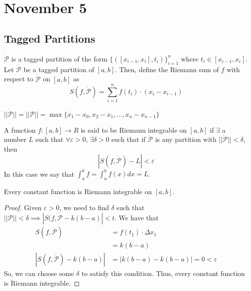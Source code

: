 \section{November 5}

\subsection{Tagged Partitions}
\begin{definition}
    $\dot{\mathcal{P}}$ is a tagged partition of the form $\{([x_{i - 1}, x_i], t_i)\}_{i = 1}^n$ where $t_i \in [x_{i - 1}, x_i]$. Let $\dot{\mathcal{P}}$ be a tagged partition of $[a, b]$. Then, define the Riemann sum of $f$ with respect to $\dot{\mathcal{P}}$ on $[a, b]$ as $$S(f, \dot{\mathcal{P}}) = \sum_{i = 1}^n f(t_i) \cdot (x_i - x_{i - 1})$$
\end{definition}
\begin{remark}
    $||\dot{\mathcal{P}}|| = ||\mathcal{P}|| = \max\{x_1 - x_0, x_2 - x_1, \ldots, x_n - x_{n - 1}\}$
\end{remark}

\begin{definition}
    A function $f: [a, b] \to R$ is said to be Riemann integrable on $[a, b]$ if $\exists$ a number $L$ such that $\forall \varepsilon > 0$, $\exists \delta > 0$ such that if $\dot{\mathcal{P}}$ is any partition with $||\dot{\mathcal{P}}|| < \delta$, then $$\left| S(f, \dot{\mathcal{P}}) - L \right| < \varepsilon$$
    In this case we say that $\int_a^b f = \int_a^b f(x) dx = L$.
\end{definition}

\begin{theorem}
    Every constant function is Riemann integrable on $[a, b]$.
\end{theorem}
\begin{proof}
    Given $\varepsilon > 0$, we need to find $\delta$ such that $||\dot{\mathcal{P}}|| < \delta \implies |S(f, \dot{\mathcal{P}} - k(b - a)| < t$. We have that
    \begin{align*}
        S(f, \dot{\mathcal{P}}) &= f(t_1) \cdot \Delta x_1 \\
        &= k(b - a) \\
        |S(f, \dot{\mathcal{P}}) - k(b - a)| &= |k(b - a) - k(b - a)| = 0 < \varepsilon
    \end{align*}
    So, we can choose some $\delta$ to satisfy this condition. Thus, every constant function is Riemann integrable.
\end{proof}

